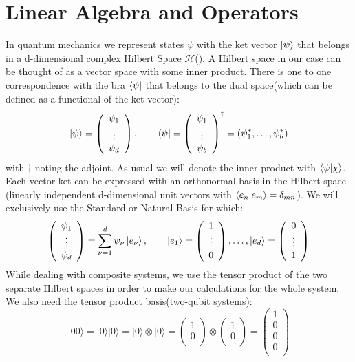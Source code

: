\section{Linear Algebra and Operators}
In quantum mechanics we represent states $\psi$ with the ket vector $\ket{\psi}$ that belongs in a d-dimensional complex Hilbert Space $\mathcal{H}$(\cite{reed1980methods}). A Hilbert space in our case can be thought of as a vector space with some inner product. There is one to one correspondence with the bra $\bra{\psi}$ that belongs to the dual space(which can be defined as a functional of the ket vector): 
$$\ket{\psi}=\left(\begin{array}{c}\psi_{1} \\ \vdots \\ \psi_{d}\end{array}\right), \qquad \bra{\psi}= \left(\begin{array}{c}\psi_{1} \\ \vdots \\ \psi_{b}\end{array}\right)^{\dagger}=\left(\psi_{1}^{*}, \ldots, \psi_{b}^{*}\right)$$
with $\dagger$ noting the adjoint. As usual we will denote the inner product with $\braket{\psi|\chi}$.
Each vector ket can be expressed with an orthonormal basis in the Hilbert space (linearly independent d-dimensional unit vectors with $\braket{e_n|e_m}=\delta_{mn}$). We will exclusively use the Standard or Natural Basis for which:
$$
\left(\begin{array}{c}
\psi_{1} \\
\vdots \\
\psi_{d}
\end{array}\right)=\sum_{\nu=1}^{d} \psi_{\nu} \ket{e_{\nu}},
\qquad
\ket{e_{1}}=\left(\begin{array}{c}
1 \\
\vdots \\
0
\end{array}\right), \ldots, \ket{e_{d}}=\left(\begin{array}{c}
0 \\
\vdots \\
1
\end{array}\right)
$$
While dealing with composite systems, we use the tensor product of the two separate Hilbert spaces in order to make our calculations for the whole system. We also need the tensor product basis(two-qubit systems):
$$
|00 \rangle=|0\rangle|0\rangle=|0\rangle \otimes |0\rangle=
\left(\begin{array}{c}
1\\
0\\
\end{array}
\right)
\otimes
\left( 
\begin{array}{c}
1\\
0\\
\end{array}
\right)=\left(\begin{array}{c}
1 \\
0\\
0\\
0\\
\end{array}\right)
$$
